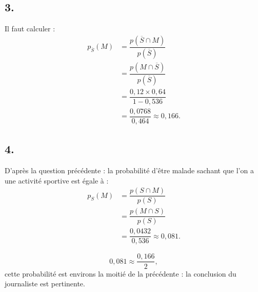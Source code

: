 \subsection*{3.} Il faut calculer :
\begin{align*}
p_{\overline{S}}(M) &= \dfrac{p(\overline{S} \cap M)}{p(\overline{S})} \\
&= \dfrac{p(M \cap \overline{S})}{p(\overline{S})} \\
&= \dfrac{0{,}12 \times 0{,}64}{1 - 0{,}536} \\
&= \dfrac{0{,}0768}{0{,}464} \approx 0{,}166.
\end{align*}

\subsection*{4.} D'après la question précédente : la probabilité d'être malade sachant que l'on a une activité sportive est égale à :
\begin{align*}
p_S(M) &= \dfrac{p(S \cap M)}{p(S)} \\
&= \dfrac{p(M \cap S)}{p(S)} \\
&= \dfrac{0{,}0432}{0{,}536} \approx 0{,}081. 
\end{align*}

\[
0{,}081 \approx \dfrac{0{,}166}{2},
\]
cette probabilité est environs la moitié de la précédente : la conclusion du journaliste est pertinente.

